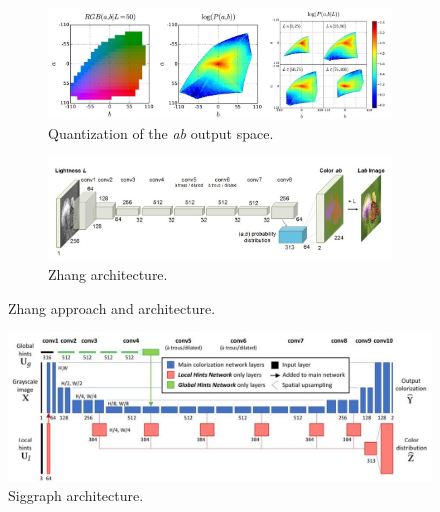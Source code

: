\documentclass[10pt,twocolumn,letterpaper]{article}
\begin{document}
\begin{figure}[t]
	\centering
	
	\begin{subfigure}[b]{0.5\textwidth}
		\centering
		\begin{adjustwidth}{-3cm}{}
			\includegraphics[width=15cm]{quantization}
		\end{adjustwidth}
		\caption{Quantization of the \textit{ab} output space.}
		\label{fig:q}
	\end{subfigure}
	
	\begin{subfigure}[b]{0.5\textwidth}
		\centering
		\begin{adjustwidth}{-3cm}{}
			\includegraphics[width=15cm]{diagram zhang}
		\end{adjustwidth}
		\caption{Zhang  architecture.}
		\label{fig:zh}
	\end{subfigure}
	
	\caption{{\small Zhang approach and architecture.}}
	\label{fig:zhang}
\end{figure}

\begin{figure}[htbp]
	\centering
	\includegraphics[width=15cm]{diagram siggraph}
	\caption{Siggraph architecture.}
	\label{fig:si}
\end{figure}
\end{document}
